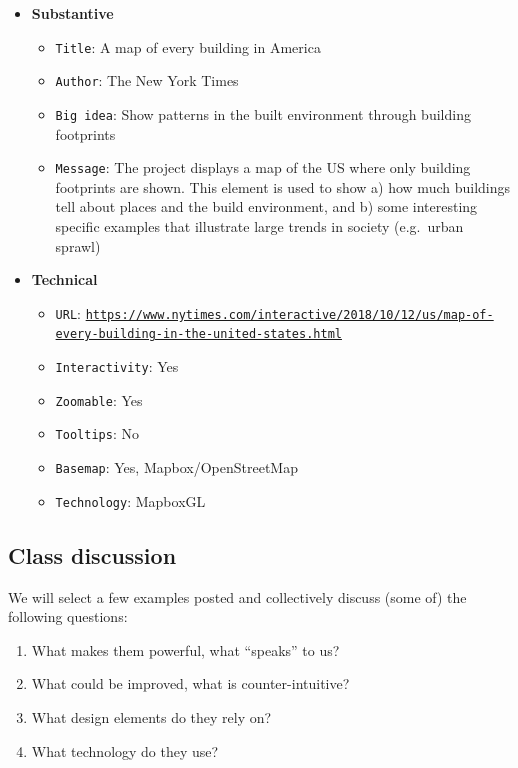\documentclass[
  letterpaper,
  DIV=11,
  numbers=noendperiod]{scrreprt}
\begin{document}
\begin{itemize}
\item
  \textbf{Substantive}

  \begin{itemize}
  \item
    \texttt{Title}: A map of every building in America
  \item
    \texttt{Author}: The New York Times
  \item
    \texttt{Big\ idea}: Show patterns in the built environment through
    building footprints
  \item
    \texttt{Message}: The project displays a map of the US where only
    building footprints are shown. This element is used to show a) how
    much buildings tell about places and the build environment, and b)
    some interesting specific examples that illustrate large trends in
    society (e.g.~urban sprawl)
  \end{itemize}
\item
  \textbf{Technical}

  \begin{itemize}
  \item
    \texttt{URL}:
    \href{https://www.nytimes.com/interactive/2018/10/12/us/map-of-every-building-in-the-united-states.html}{\texttt{https://www.nytimes.com/interactive/2018/10/12/us/map-of-every-building-in-the-united-states.html}}
  \item
    \texttt{Interactivity}: Yes
  \item
    \texttt{Zoomable}: Yes
  \item
    \texttt{Tooltips}: No
  \item
    \texttt{Basemap}: Yes, Mapbox/OpenStreetMap
  \item
    \texttt{Technology}: MapboxGL
  \end{itemize}
\end{itemize}

\hypertarget{class-discussion}{%
\subsection{Class discussion}\label{class-discussion}}

We will select a few examples posted and collectively discuss (some of)
the following questions:

\begin{enumerate}
\def\labelenumi{\arabic{enumi}.}
\item
  What makes them powerful, what ``speaks'' to us?
\item
  What could be improved, what is counter-intuitive?
\item
  What design elements do they rely on?
\item
  What technology do they use?
\end{enumerate}
\end{document}

